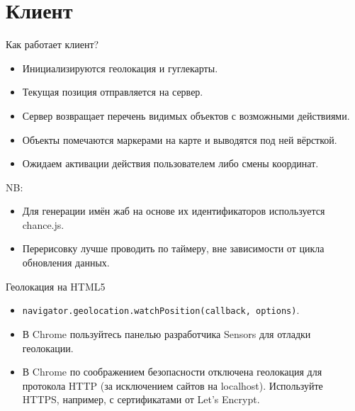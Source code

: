 \documentclass[aspectratio=169,handout,bigger]{beamer}
\begin{document}

\section{Клиент}


\begin{frame}{Как работает клиент?}
  \begin{itemize}
    \item Инициализируются геолокация и гуглекарты.
    \item Текущая позиция отправляется на сервер.
    \item Сервер возвращает перечень видимых объектов с возможными действиями.
    \item Объекты помечаются маркерами на карте и выводятся под ней вёрсткой.
    \item Ожидаем активации действия пользователем либо смены координат.
  \end{itemize}
  \vspace*{1em}\par
  NB:
  \begin{itemize}
    \item Для генерации имён жаб на основе их идентификаторов
          используется chance.js.
    \item Перерисовку лучше проводить по таймеру,
          вне зависимости от цикла обновления данных.
  \end{itemize}
\end{frame}


\begin{frame}{Геолокация на HTML5}
  \begin{itemize}
    \item \texttt{navigator.geolocation.watchPosition(callback, options)}.
    \item В Chrome пользуйтесь панелью разработчика Sensors для
          отладки геолокации.
    \item В Chrome по соображением безопасности отключена геолокация
          для протокола HTTP (за исключением сайтов на localhost).
          Используйте HTTPS, например, с сертификатами от Let's Encrypt.
  \end{itemize}
\end{frame}
\end{document}
